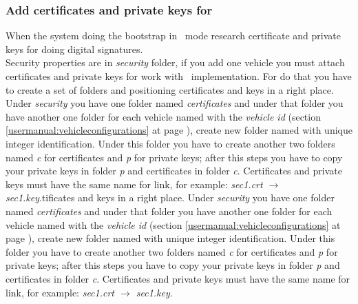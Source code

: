 \subsubsection{Add certificates and private keys for \baseline}\label{usermanual:preloadkey}
When the system doing the bootstrap in \baseline~mode research certificate and private keys for doing digital signatures.\\
Security properties are in \textit{security} folder, if you add one vehicle you must attach certificates and private keys for work with \baseline~implementation. For do that you have to create a set of folders and positioning certificates and keys in a right place. Under \textit{security} you have one folder named \textit{certificates} and under that folder you have another one folder for each vehicle named with the \textit{vehicle id} (section \ref{usermanual:vehicleconfigurations} at page \pageref{usermanual:vehicleconfigurations}), create new folder named with unique integer identification. Under this folder you have to create another two folders named \textit{c} for certificates and \textit{p} for private keys; after this steps you have to copy your private keys in folder \textit{p} and certificates in folder \textit{c}. Certificates and private keys must have the same name for link, for example: \textit{sec1.crt $\rightarrow$ sec1.key}.tificates and keys in a right place. Under \textit{security} you have one folder named \textit{certificates} and under that folder you have another one folder for each vehicle named with the \textit{vehicle id} (section \ref{usermanual:vehicleconfigurations} at page \pageref{usermanual:vehicleconfigurations}), create new folder named with unique integer identification. Under this folder you have to create another two folders named \textit{c} for certificates and \textit{p} for private keys; after this steps you have to copy your private keys in folder \textit{p} and certificates in folder \textit{c}. Certificates and private keys must have the same name for link, for example: \textit{sec1.crt $\rightarrow$ sec1.key}.

